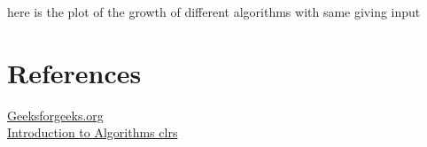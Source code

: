 \documentclass[
10pt, %
a4paper, %
oneside, %
headinclude,footinclude, %
BCOR5mm, %
]{scrartcl}
\begin{document}
here is the plot of the growth of different algorithms with same giving input






\section{References}
 \href{https://www.geeksforgeeks.org/}{Geeksforgeeks.org}
 \\
 \href{https://www.amazon.com/Introduction-Algorithms-3rd-MIT-Press/dp/0262033844}{Introduction to Algorithms clrs}
 



\label{fig:esempio}



\renewcommand{\refname}{\spacedlowsmallcaps{References}} %



 
\end{document}
